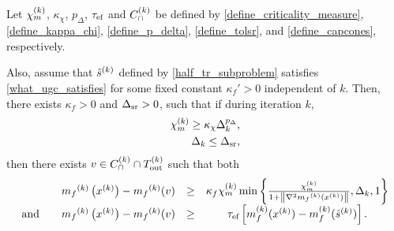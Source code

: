 % 

\begin{theorem}

\label{sufficient_reduction_theorem}
Let 
${\chi_m^{(k)}}$,
$\kappa_{\chi}$,
$p_{\Delta}$,
${\tau_{\textrm{ef}}}$
and ${C^{(k)}_{\cap}}$
be defined by
\cref{define_criticality_measure},
\cref{define_kappa_chi},
\cref{define_p_delta},
\cref{define_tolsr},
and \cref{define_capcones},
respectively.



Also, assume that ${{\hat s}^{(k)}}$ defined by \cref{half_tr_subproblem} satisfies \cref{what_ugc_satisfies} for some fixed constant $\kappa_f'>0$ independent of $k$.
Then, there exists $\kappa_f>0$ and ${\Delta_{\textrm{sr}}}>0$, such that if during iteration $k$,
\begin{align}
{\chi_m^{(k)}} \ge \kappa_{\chi} \Delta_k^{p_{\Delta}}, \label{sr_chi_big_enough} \\
\Delta_k \le {\Delta_{\textrm{sr}}}, \label{sr_delta_small_enough}
\end{align}
then there exists $v \in {C^{(k)}_{\cap}} \cap {T_{\text{out}}^{(k)}}$ such that both
\begin{align*}
\begin{array}{cccc}
& {{m}_f}^{(k)}\left(x^{(k)}\right) - {{m}_f}^{(k)}(v) & \ge & \kappa_f {\chi_m^{(k)}} \min\left\{ \frac{{\chi_m^{(k)}}}{1+\left\|\nabla^2 {{m}_f}^{(k)}(x^{(k)})\right\|}, \Delta_k, 1 \right\} \\
\textrm{and} \quad & {{m}_f}^{(k)}\left(x^{(k)}\right) - {{m}_f}^{(k)}(v) &\ge& {\tau_{\textrm{ef}}}\left[m_f^{(k)}(x^{(k)}) - m_f^{(k)}({{\hat s}^{(k)}})\right].
\end{array}
\end{align*}

\end{theorem}

